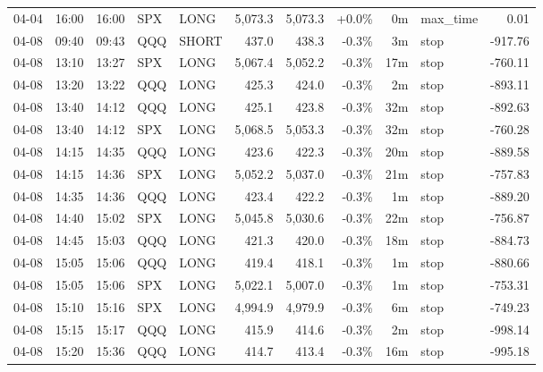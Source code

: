 \documentclass[11pt,a4paper,twoside]{article}
\begin{document}
\begin{center}
\begin{longtable}{>{\color{txtmain}}l l l l l r r r r >{\color{txtmain}}l r}
04-04 & 16:00 & 16:00 & SPX & LONG & 5,073.3 & 5,073.3 & \textcolor{wingreen}{+0.0\%} & 0m & max\_time & \textcolor{wingreen}{0.01} \\
04-08 & 09:40 & 09:43 & QQQ & SHORT & 437.0 & 438.3 & \textcolor{lossred}{-0.3\%} & 3m & stop & \textcolor{lossred}{-917.76} \\
04-08 & 13:10 & 13:27 & SPX & LONG & 5,067.4 & 5,052.2 & \textcolor{lossred}{-0.3\%} & 17m & stop & \textcolor{lossred}{-760.11} \\
04-08 & 13:20 & 13:22 & QQQ & LONG & 425.3 & 424.0 & \textcolor{lossred}{-0.3\%} & 2m & stop & \textcolor{lossred}{-893.11} \\
04-08 & 13:40 & 14:12 & QQQ & LONG & 425.1 & 423.8 & \textcolor{lossred}{-0.3\%} & 32m & stop & \textcolor{lossred}{-892.63} \\
04-08 & 13:40 & 14:12 & SPX & LONG & 5,068.5 & 5,053.3 & \textcolor{lossred}{-0.3\%} & 32m & stop & \textcolor{lossred}{-760.28} \\
04-08 & 14:15 & 14:35 & QQQ & LONG & 423.6 & 422.3 & \textcolor{lossred}{-0.3\%} & 20m & stop & \textcolor{lossred}{-889.58} \\
04-08 & 14:15 & 14:36 & SPX & LONG & 5,052.2 & 5,037.0 & \textcolor{lossred}{-0.3\%} & 21m & stop & \textcolor{lossred}{-757.83} \\
04-08 & 14:35 & 14:36 & QQQ & LONG & 423.4 & 422.2 & \textcolor{lossred}{-0.3\%} & 1m & stop & \textcolor{lossred}{-889.20} \\
04-08 & 14:40 & 15:02 & SPX & LONG & 5,045.8 & 5,030.6 & \textcolor{lossred}{-0.3\%} & 22m & stop & \textcolor{lossred}{-756.87} \\
04-08 & 14:45 & 15:03 & QQQ & LONG & 421.3 & 420.0 & \textcolor{lossred}{-0.3\%} & 18m & stop & \textcolor{lossred}{-884.73} \\
04-08 & 15:05 & 15:06 & QQQ & LONG & 419.4 & 418.1 & \textcolor{lossred}{-0.3\%} & 1m & stop & \textcolor{lossred}{-880.66} \\
04-08 & 15:05 & 15:06 & SPX & LONG & 5,022.1 & 5,007.0 & \textcolor{lossred}{-0.3\%} & 1m & stop & \textcolor{lossred}{-753.31} \\
04-08 & 15:10 & 15:16 & SPX & LONG & 4,994.9 & 4,979.9 & \textcolor{lossred}{-0.3\%} & 6m & stop & \textcolor{lossred}{-749.23} \\
04-08 & 15:15 & 15:17 & QQQ & LONG & 415.9 & 414.6 & \textcolor{lossred}{-0.3\%} & 2m & stop & \textcolor{lossred}{-998.14} \\
04-08 & 15:20 & 15:36 & QQQ & LONG & 414.7 & 413.4 & \textcolor{lossred}{-0.3\%} & 16m & stop & \textcolor{lossred}{-995.18} \\

\end{longtable}
\end{center}
\end{document}
